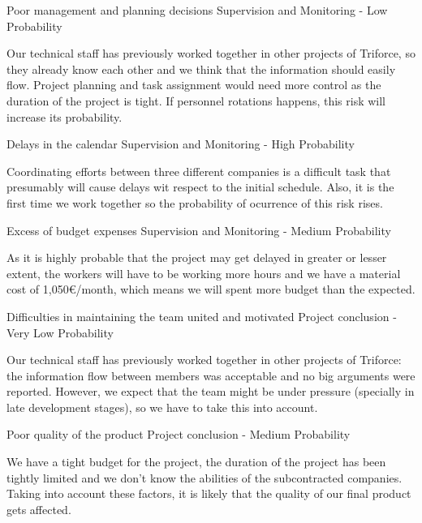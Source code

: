 \begin{risk}{Poor management and planning decisions}
\riskcat Supervision and Monitoring
 - Low Probability 

Our technical staff has previously worked together in other projects of Triforce, so they already know each other and we think that the information should easily flow. Project planning and task assignment would need more control as the duration of the project is tight. If personnel rotations happens, this risk will increase its probability.
\end{risk}

\begin{risk}{Delays in the calendar}
\riskcat Supervision and Monitoring
 - High Probability 

Coordinating efforts between three different companies is a difficult task that presumably will cause delays wit respect to the initial schedule. Also, it is the first time we work together so the probability of ocurrence of this risk rises.
\end{risk}

\begin{risk}{Excess of budget expenses}
\riskcat Supervision and Monitoring
 - Medium Probability 

As it is highly probable that the project may get delayed in greater or lesser extent, the workers will have to be working more hours and we have a material cost of 1,050\euro/month, which means we will spent more budget than the expected.
\end{risk}

\begin{risk}{Difficulties in maintaining the team united and motivated}
\riskcat Project conclusion
 - Very Low Probability 

Our technical staff has previously worked together in other projects of Triforce: the information flow between members was acceptable and no big arguments were reported. However, we expect that the team might be under pressure (specially in late development stages), so we have to take this into account.
\end{risk}

\begin{risk}{Poor quality of the product}
\riskcat Project conclusion
 - Medium Probability 

We have a tight budget for the project, the duration of the project has been tightly limited and we don't know the abilities of the subcontracted companies. Taking into account these factors, it is likely that the quality of our final product gets affected.
\end{risk}


